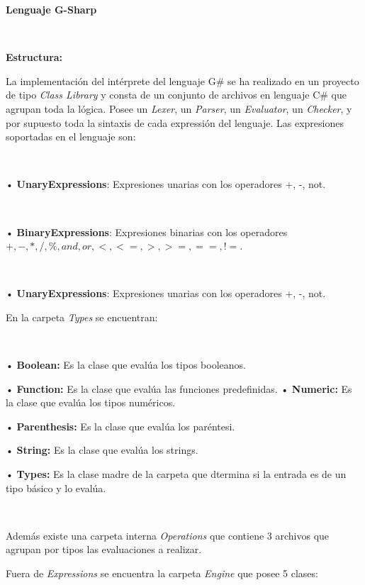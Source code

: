 \documentclass{article}
\begin{document}
\newpage

\begin{center}
	\textbf{{\Huge {Lenguaje G-Sharp}}}
\end{center}


\ 


\begin{center}
	\large\textbf{Estructura:}
\end{center}


La implementación del intérprete del lenguaje G\# se ha realizado en un proyecto de tipo \textit{Class Library} y consta de 
un conjunto de archivos en lenguaje C\# que agrupan toda la lógica. Posee un \textit{Lexer}, un \textit{Parser}, un 
\textit{Evaluator}, un \textit{Checker}, y por supuesto toda la sintaxis de cada expressión del lenguaje. Las expresiones
soportadas en el lenguaje son:


\


• \textbf{UnaryExpressions}: Expresiones unarias con los operadores +, -, not.


\ 


• \textbf{BinaryExpressions}: Expresiones binarias con los operadores $+, -, *, /, \%, and, or, <, <=, >, >=, ==, !=$. 


\ 


• \textbf{UnaryExpressions}: Expresiones unarias con los operadores +, -, not. 


En la carpeta {\textit{Types}} se encuentran:


\


• \textbf{Boolean:} Es la clase que evalúa los tipos booleanos. 

• \textbf{Function:} Es la clase que evalúa las funciones predefinidas. 
• \textbf{Numeric:} Es la clase que evalúa los tipos numéricos.

• \textbf{Parenthesis:} Es la clase que evalúa los paréntesi.

• \textbf{String:} Es la clase que evalúa los strings.

• \textbf{Types:} Es la clase madre de la carpeta que dtermina si la entrada es de un tipo básico
y lo evalúa.



\


Además existe una carpeta interna {\textit{Operations}} que contiene 3 archivos que agrupan por tipos las 
evaluaciones a realizar.

Fuera de {\textit{Expressions}} se encuentra la carpeta {\textit{Engine}} que posee 5 clases:


\
\end{document}
